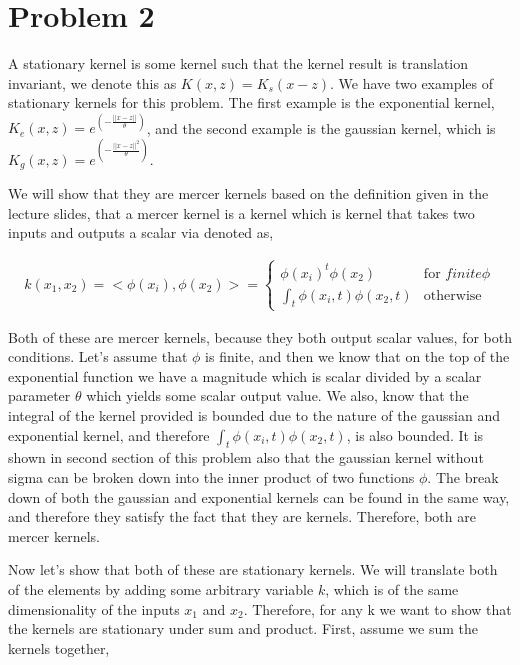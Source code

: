 \documentclass[paper=a4, fontsize=11pt]{scrartcl} %
\begin{document}
\section{Problem 2}

A stationary kernel is some kernel such that the kernel result is translation invariant, we denote this as $K(x,z) = K_s(x-z)$.  We have two examples of stationary kernels for this problem.  The first example is the exponential kernel, $K_e(x,z) = e^{(-\frac{||x-z||}{\theta})}$, and the second example is the gaussian kernel, which is $K_g(x,z) = e^{(-\frac{||x-z||^2}{\theta})}$.

We will show that they are mercer kernels based on the definition given in the lecture slides, that a mercer kernel is a kernel which is kernel that takes two inputs and outputs a scalar via denoted as,

\begin{align}
k(x_1,x_2) = <\phi(x_i),\phi(x_2)> = \left\{
	\begin{array}{ll}
		\phi(x_i)^t\phi(x_2) & \mbox{for } finite \phi \\
		\int_t \phi(x_i,t)\phi(x_2,t) & \mbox{otherwise} 
	\end{array}
\right.
\end{align} 

Both of these are mercer kernels, because they both output scalar values, for both conditions.
Let's assume that $\phi$ is finite, and then we know that on the top of the exponential function we have a magnitude which is scalar divided by a scalar parameter $\theta$ which yields some scalar output value.
We also, know that the integral of the kernel provided is bounded due to the nature of the gaussian and exponential kernel, and therefore $\int_t \phi(x_i,t)\phi(x_2,t)$, is also bounded.  
It is shown in second section of this problem also that the gaussian kernel without sigma can be broken down into the inner product of two functions $\phi$.
The break down of both the gaussian and exponential kernels can be found in the same way, and therefore they satisfy the fact that they are kernels.
Therefore, both are mercer kernels.

Now let's show that both of these are stationary kernels.  We will translate both of the elements by adding some arbitrary variable $k$, which is of the same dimensionality of the inputs $x_1$ and $x_2$.  Therefore, for any k we want to show that the kernels are stationary under sum and product.  First, assume we sum the kernels together,
\end{document}
